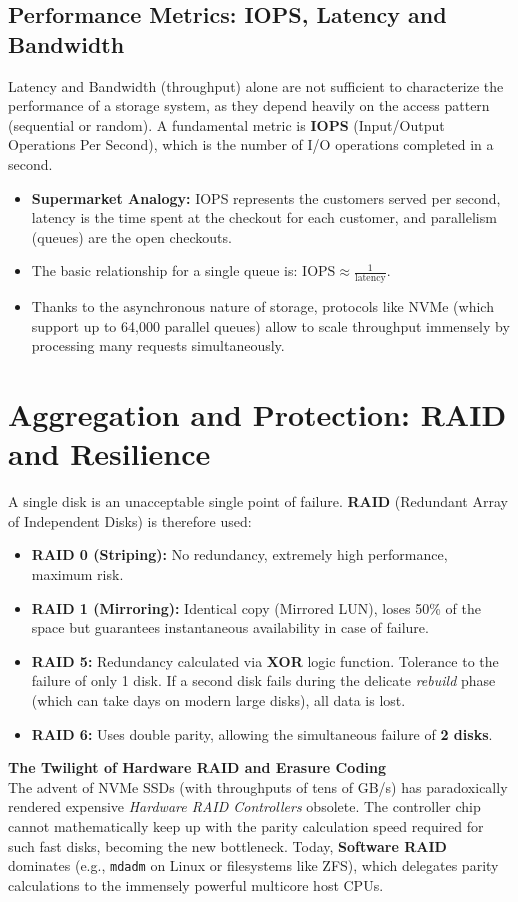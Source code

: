 \subsection{Performance Metrics: IOPS, Latency and Bandwidth}
Latency and Bandwidth (throughput) alone are not sufficient to characterize the performance of a storage system, as they depend heavily on the access pattern (sequential or random). 
A fundamental metric is \textbf{IOPS} (Input/Output Operations Per Second), which is the number of I/O operations completed in a second.
\begin{itemize}
    \item \textbf{Supermarket Analogy:} IOPS represents the customers served per second, latency is the time spent at the checkout for each customer, and parallelism (queues) are the open checkouts.
    \item The basic relationship for a single queue is: $\text{IOPS} \approx \frac{1}{\text{latency}}$.
    \item Thanks to the asynchronous nature of storage, protocols like NVMe (which support up to 64,000 parallel queues) allow to scale throughput immensely by processing many requests simultaneously.
\end{itemize}

\section{Aggregation and Protection: RAID and Resilience}
A single disk is an unacceptable single point of failure. \textbf{RAID} (Redundant Array of Independent Disks) is therefore used:
\begin{itemize}
    \item \textbf{RAID 0 (Striping):} No redundancy, extremely high performance, maximum risk.
    \item \textbf{RAID 1 (Mirroring):} Identical copy (Mirrored LUN), loses 50\% of the space but guarantees instantaneous availability in case of failure.
    \item \textbf{RAID 5:} Redundancy calculated via \textbf{XOR} logic function. Tolerance to the failure of only 1 disk. If a second disk fails during the delicate \textit{rebuild} phase (which can take days on modern large disks), all data is lost.
    \item \textbf{RAID 6:} Uses double parity, allowing the simultaneous failure of \textbf{2 disks}.
\end{itemize}

\textbf{The Twilight of Hardware RAID and Erasure Coding}\\
The advent of NVMe SSDs (with throughputs of tens of GB/s) has paradoxically rendered expensive \textit{Hardware RAID Controllers} obsolete. The controller chip cannot mathematically keep up with the parity calculation speed required for such fast disks, becoming the new bottleneck. Today, \textbf{Software RAID} dominates (e.g., \texttt{mdadm} on Linux or filesystems like ZFS), which delegates parity calculations to the immensely powerful multicore host CPUs.


